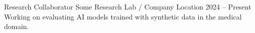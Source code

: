 

\cventry
  {Research Collaborator}
  {Some Research Lab / Company}
  {Location}
  {2024 -- Present}
  {}
  {Working on evaluating AI models trained with synthetic data in the medical domain.}